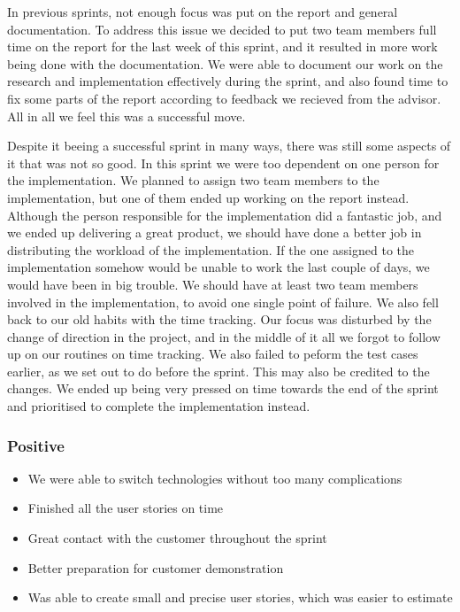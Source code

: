 In previous sprints, not enough focus was put on the report and general documentation. To address this issue we decided to put two team members full time on the report for the last week of this sprint, and it resulted in more work being done with the documentation. We were able to document our work on the research and implementation effectively during the sprint, and also found time to fix some parts of the report according to feedback we recieved from the advisor. All in all we feel this was a successful move.

Despite it beeing a successful sprint in many ways, there was still some aspects of it that was not so good. In this sprint we were too dependent on one person for the implementation. We planned to assign two team members to the implementation, but one of them ended up working on the report instead. Although the person responsible for the implementation did a fantastic job, and we ended up delivering a great product, we should have done a better job in distributing the workload of the implementation. If the one assigned to the implementation somehow would be unable to work the last couple of days, we would have been in big trouble. We should have at least two team members involved in the implementation, to avoid one single point of failure. We also fell back to our old habits with the time tracking. Our focus was disturbed by the change of direction in the project, and in the middle of it all we forgot to follow up on our routines on time tracking. We also failed to peform the test cases earlier, as we set out to do before the sprint. This may also be credited to the changes. We ended up being very pressed on time towards the end of the sprint and prioritised to complete the implementation instead.

\subsubsection{Positive}

\begin{itemize}
\item We were able to switch technologies without too many complications
\item Finished all the user stories on time
\item Great contact with the customer throughout the sprint
\item Better preparation for customer demonstration
\item Was able to create small and precise user stories, which was easier to estimate
\end{itemize}

